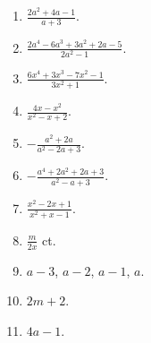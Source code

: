 \documentclass{book}
\begin{document}
\begin{enumerate}
\item $\displaystyle \frac{2a^2+4a-1}{a+3}$.

\item $\displaystyle \frac{2a^4-6a^3+3a^2+2a-5}{2a^2-1}$.

\item $\displaystyle \frac{6x^4+3x^3-7x^2-1}{3x^2+1}$.

\item $\displaystyle \frac{4x-x^2}{x^2-x+2}$.

\item $\displaystyle -\frac{a^2+2a}{a^2-2a+3}$.

\item $\displaystyle -\frac{a^4+2a^2+2a+3}{a^2-a+3}$.

\item $\displaystyle \frac{x^2-2x+1}{x^2+x-1}$.

\setcounter{enumi}{41}

\item $\displaystyle \frac{m}{2x}$ ct.

\item $a-3$, $a-2$, $a-1$, $a$.

\item $2m+2$.

\item $4a-1$.
\end{enumerate}
\end{document}
